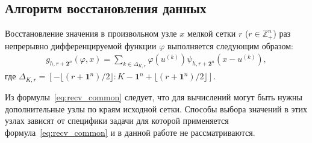 
\label{sec:func_recv}

\subsection*{Алгоритм восстановления данных}

Восстановление значения в произвольном  узле $x$    мелкой сетки %
$r$ ($r\in\mathbb{Z}_+^n$) раз непрерывно дифференцируемой функции $\varphi$
выполняется следующим образом: 
\begin{gather}
  \label{eq:recv_common}
  g_{h,r+\mathbf{2}^n}(\varphi, x) = \sum_{k\in  \Delta_{K,r}}
   \varphi(u^{(k)})
   \psi_{h, r+\mathbf{2}^n}(x-u^{(k)}),%
 \end{gather}
 где $ \Delta_{K,r}=\left[-\lfloor{(r+\mathbf{1}^n)/2}\rfloor:
   K-\mathbf{1}^n+\lfloor{(r+\mathbf{1}^n)/2}\rfloor\right]$.  %

 
Из формулы~\eqref{eq:recv_common} следует, что для вычислений
могут быть нужны дополнительные
узлы по краям исходной сетки.
Способы выбора значений в этих узлах зависят
от специфики задачи для которой применяется формула~\eqref{eq:recv_common}  
и в данной работе не рассматриваются.








